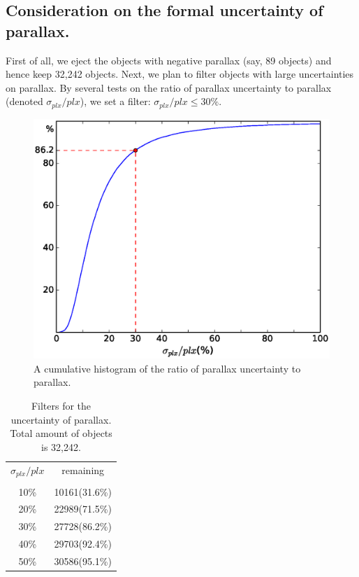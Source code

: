 \documentclass[onecolumn]{aa}   %
\begin{document}
\subsection{Consideration on the formal uncertainty of parallax.}
First of all, we eject the objects with negative parallax (say, 89 objects) and hence keep 32,242 objects. Next, we plan to filter objects with large uncertainties on parallax. By several tests on the ratio of parallax uncertainty to parallax (denoted $\sigma_{plx}/plx$), we set a filter: $\sigma_{plx}/plx \le 30\% $. 
\begin{figure}[hbtp]
  \centering
  \includegraphics[width=\columnwidth]{figures/PlxErr2Plx}  %
  \caption[]{\label{fig: plxerr}
  A cumulative histogram of the ratio of parallax uncertainty to parallax.
    }
  \end{figure}


\begin{table}[ht]
\caption{\label{tab: plxerr}
Filters for the uncertainty of parallax. Total amount of objects is 32,242.}
\centering
\begin{tabular}{c c}
\hline
$\sigma_{plx}/plx$	&remaining \\
\\ \hline
10\% 			&10161(31.6\%) \\  
20\%				&22989(71.5\%) \\
30\%				&27728(86.2\%) \\
40\% 			&29703(92.4\%) \\
50\%				&30586(95.1\%) \\
\hline
\end{tabular}
\end{table}
\end{document}
